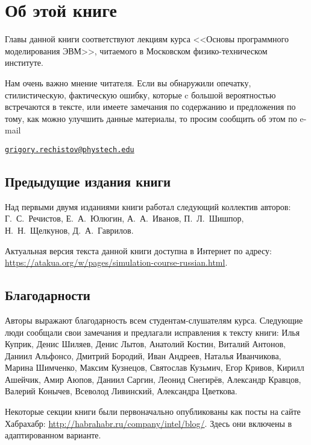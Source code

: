 
\chapter*{Об этой книге}\label{chap:contrib}

Главы данной книги соответствуют лекциям курса <<Основы программного моделирования ЭВМ>>, читаемого в Московском физико-техническом институте.

Нам очень важно мнение читателя. Если вы обнаружили опечатку, стилистическую, фактическую ошибку, которые c большой вероятностью встречаются в тексте, или имеете замечания по содержанию и предложения по тому, как можно улучшить данные материалы, то просим сообщить об этом по e-mail 

\begin{center}
\href{mailto:grigory.rechistov@phystech.edu}{\texttt{grigory.rechistov@phystech.edu}}
\end{center}


\section*{Предыдущие издания книги}

Над первыми двумя изданиями книги работал следующий коллектив авторов: Г.~С.~Речистов, Е.~А.~Юлюгин, А.~А.~Иванов, П.~Л.~Шишпор, Н.~Н.~Щелкунов, Д.~А.~Гаврилов.

Актуальная версия текста данной книги доступна в Интернет по адресу: \url{https://atakua.org/w/pages/simulation-course-russian.html}.

\section*{Благодарности}


Авторы выражают благодарность всем студентам-слушателям курса. Следующие люди сообщали свои замечания и предлагали исправления к тексту книги: Илья Куприк, Денис Шиляев, Денис Лытов, Анатолий Костин, Виталий Антонов, Даниил Альфонсо, Дмитрий Бородий, Иван Андреев, Наталья Иванчикова, Марина Шимченко, Максим Кузнецов, Святослав Кузьмич, Егор Кривов, Кирилл Ашейчик, Амир Аюпов, Даниил Саргин, Леонид Снегирёв, Александр Кравцов, Валерий Конычев, Всеволод Ливинский, Александра Цветкова.

Некоторые секции книги были первоначально опубликованы как посты на сайте Хабрахабр: \url{http://habrahabr.ru/company/intel/blog/}. Здесь они включены в адаптированном варианте.


